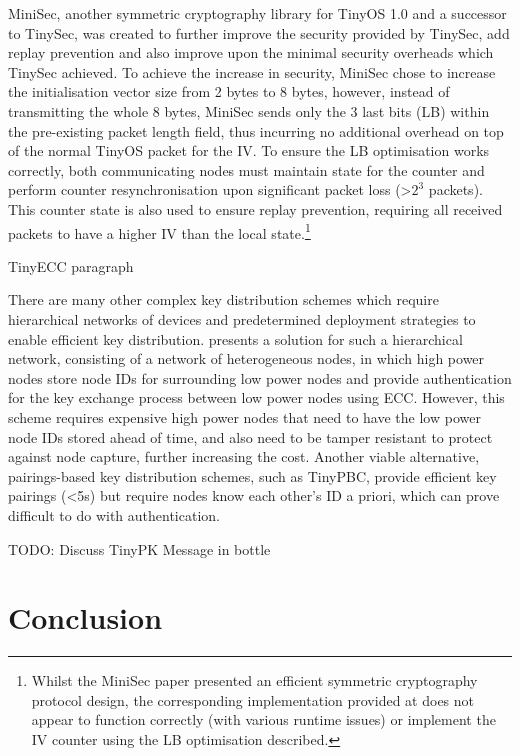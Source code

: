 \documentclass[conference]{./sty/IEEEtran}
\begin{document}
MiniSec, another symmetric cryptography library for TinyOS 1.0 and a successor to TinySec, was created to further improve the security provided by TinySec, add replay prevention and also improve upon the minimal security overheads which TinySec achieved. To achieve the increase in security, MiniSec chose to increase the initialisation vector size from 2 bytes to 8 bytes, however, instead of transmitting the whole 8 bytes, MiniSec sends only the 3 last bits (LB) within the pre-existing packet length field, thus incurring no additional overhead on top of the normal TinyOS packet for the IV. To ensure the LB optimisation works correctly, both communicating nodes must maintain state for the counter and perform counter resynchronisation upon significant packet loss (\textgreater$2^3$ packets). This counter state is also used to ensure replay prevention, requiring all received packets to have a higher IV than the local state.\footnote{Whilst the MiniSec paper presented an efficient symmetric cryptography protocol design, the corresponding implementation provided at \cite{MiniSecLink} does not appear to function correctly (with various runtime issues) or implement the IV counter using the LB optimisation described.}

TinyECC paragraph \cite{TinyECC}

There are many other complex key distribution schemes which require hierarchical networks of devices \cite{MizanurRahman2010858,Shi2013235} and predetermined deployment strategies to enable efficient key distribution. \cite{MizanurRahman2010858} presents a solution for such a hierarchical network, consisting of a network of heterogeneous nodes, in which high power nodes store node IDs for surrounding low power nodes and provide authentication for the key exchange process between low power nodes using ECC. However, this scheme requires expensive high power nodes that need to have the low power node IDs stored ahead of time, and also need to be tamper resistant to protect against node capture, further increasing the cost. Another viable alternative, pairings-based key distribution schemes, such as TinyPBC\cite{TinyPBC}, provide efficient key pairings (\textless5s) but require nodes know each other's ID a priori, which can prove difficult to do with authentication. 

TODO: Discuss TinyPK  \cite{TinyPK}Message in bottle \cite{MessageBottle}


\section{Conclusion}
\label{sec:conclusion}
\end{document}
